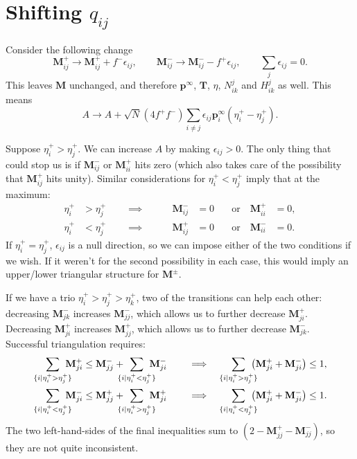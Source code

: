 \documentclass[12pt]{article}
\newcommand{\M}{\mathbf{M}}
\newcommand{\pp}{\mathbf{p}^\infty}
\newcommand{\T}{\mathbf{T}}
\begin{document}
\section{Shifting $q_{ij}$}\label{sec:shiftq}

Consider the following change
%
\begin{equation}\label{eq:shiftq}
  \M^+_{ij} \to \M^+_{ij} + f^-\epsilon_{ij},
  \qquad
  \M^-_{ij} \to \M^-_{ij} - f^+\epsilon_{ij},
  \qquad
  \sum_j \epsilon_{ij} = 0.
\end{equation}
%
This leaves $\M$ unchanged, and therefore $\pp$, $\T$, $\eta$, $N^j_{ik}$ and $H^j_{ik}$ as well. This means
%
\begin{equation}\label{eq:shiftqarea}
  A \to A + \sqrt{N}(4f^+f^-) \sum_{i \neq j} \epsilon_{ij} \pp_i (\eta^+_i - \eta^+_j).
\end{equation}
%

Suppose $\eta^+_i > \eta^+_j$. We can increase $A$ by making $\epsilon_{ij}>0$. The only thing that could stop us is if $\M^-_{ij}$ or $\M^+_{ii}$ hits zero (which also takes care of the possibility that $\M^+_{ij}$ hits unity). Similar considerations for $\eta^+_i < \eta^+_j$ imply that at the maximum:
%
\begin{equation}\label{eq:shiftqmax}
  \begin{aligned}
    \eta^+_i &> \eta^+_j \qquad\implies\qquad & \M^-_{ij} &= 0 \quad&\text{or}\quad \M^+_{ii} &= 0 ,\\
    \eta^+_i &< \eta^+_j \qquad\implies & \M^+_{ij} &= 0 &\text{or}\quad \M^-_{ii} &= 0 .
  \end{aligned}
\end{equation}
%
If $\eta^+_i = \eta^+_j$, $\epsilon_{ij}$ is a null direction, so we can impose either of the two conditions if we wish. If it weren't for the second possibility in each case, this would imply an upper/lower triangular structure for $\M^\pm$.

If we have a trio $\eta^+_i > \eta^+_j > \eta^+_k$, two of the transitions can help each other: decreasing $\M^-_{jk}$ increases $\M^-_{jj}$, which allows us to further decrease $\M^+_{ji}$. Decreasing $\M^+_{ji}$ increases $\M^+_{jj}$, which allows us to further decrease $\M^-_{jk}$.
Successful triangulation requires:
%
\begin{equation}\label{eq:trianglesuccess}
  \begin{aligned}
    \sum_{\{i \mid \eta^+_i > \eta^+_j\}}\!\!\!\!\! \M^+_{ji}
     &\leq \M^-_{jj} + \!\!\!\!\!\sum_{\{i \mid \eta^+_i < \eta^+_j\}}\!\!\!\!\! \M^-_{ji}
    \qquad \implies&
    \sum_{\{i \mid \eta^+_i > \eta^+_j\}}\!\!\!\!\! \prn{\M^+_{ji} + \M^-_{ji}}
     \leq 1 ,\\
    \sum_{\{i \mid \eta^+_i < \eta^+_j\}}\!\!\!\!\! \M^-_{ji}
     &\leq \M^+_{jj} + \!\!\!\!\!\sum_{\{i \mid \eta^+_i > \eta^+_j\}}\!\!\!\!\! \M^+_{ji}
    \qquad \implies&
    \sum_{\{i \mid \eta^+_i < \eta^+_j\}}\!\!\!\!\! \prn{\M^+_{ji} + \M^-_{ji}}
     \leq 1 .\\
  \end{aligned}
\end{equation}
%
The two left-hand-sides of the final inequalities sum to $(2-\M^+_{jj}-\M^-_{jj})$, so they are not quite inconsistent.
\end{document}
